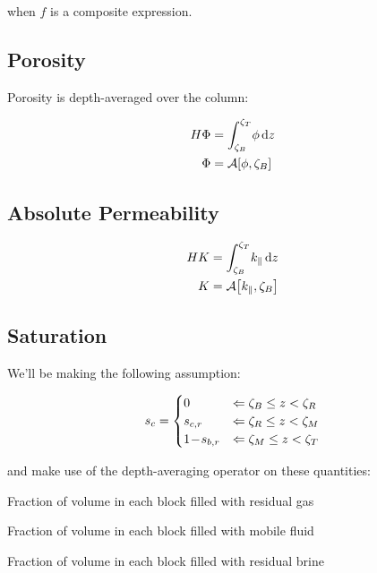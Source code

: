 \documentclass[12pt]{scrartcl}
\newcommand{\wid}[1]{\widthof{\bfseries {#1} \hspace{\labelsep}}}
\newcommand{\aleft}{\mathopen{}\mathclose\bgroup\left}  %
\newcommand{\aright}{\aftergroup\egroup\right}          %
\newcommand{\binop}[3]{#1\mkern1mu{#2}\mkern1mu #3}     %
\newcommand{\dual}[1]{\binop{1}{-}{#1}}                 %
\newcommand{\ddual}[2]{\binop{\binop{1}{-}{#1}}{-}{#2}} %
\newcommand{\intg}[4]{\int_{#1}^{#2}\!{#3}\,\mathrm{d}{#4}}   %
\newcommand{\latr}[1]{{#1}_{\|}}                              %
\newcommand{\Hei}{H}        %
\newcommand{\Por}{\Phi}     %
\newcommand{\por}{\phi}     %
\newcommand{\sat}{s}        %
\newcommand{\sr}[1]{\sat_{#1,r}}    %
\newcommand{\Prm}{K}        %
\newcommand{\prm}{k}        %
\newcommand{\Lev}{\zeta}    %
\newcommand{\Top}{T}        %
\newcommand{\Bot}{B}        %
\newcommand{\Res}{R}        %
\newcommand{\Mob}{M}        %
\newcommand{\dph}{z}        %
\newcommand{\nap}{c}        %
\newcommand{\wet}{b}        %
\newcommand{\avg}[2]{\mathcal{A}\aleft[#1, #2\aright]}  %
\newcommand{\f}{f}          %
\newcommand{\satn}{\sat_\nap}
\newcommand{\snr}{\sr{\nap}}    %
\newcommand{\swr}{\sr{\wet}}    %
\newcommand{\LevT}{\Lev_\Top}
\newcommand{\LevB}{\Lev_\Bot}
\newcommand{\LevM}{\Lev_\Mob}
\newcommand{\LevR}{\Lev_\Res}
\begin{document}
when \( \f \) is a composite expression.

\subsection{Porosity}
Porosity is depth-averaged over the column:

\begin{align}
\Hei \Por &= \intg{ \LevB }{ \LevT }{ \por }{ \dph } \\
\Por &= \avg{ \por }{ \LevB }
\end{align}

\subsection{Absolute Permeability}
\begin{align}
\Hei \Prm &= \intg{ \LevB }{ \LevT }{ \latr{ \prm } }{ \dph } \\
\Prm &= \avg{ \latr{ \prm } }{ \LevB }
\end{align}

\subsection{Saturation}
We'll be making the following assumption:

\begin{equation}
\satn =
\begin{cases}
0        & \Leftarrow \LevB \leq \dph < \LevR \\
\snr     & \Leftarrow \LevR \leq \dph < \LevM \\
\dual{ \swr } & \Leftarrow \LevM \leq \dph < \LevT
\end{cases}
\end{equation}

and make use of the depth-averaging operator on these quantities:

\begin{description}[labelwidth=\wid{\( \por \left( \ddual{ \swr }{ \snr } \right) \)}]
\item[ \( \por \left( \snr \right) \) ] Fraction of volume in each block filled with residual gas
\item[ \( \por \left( \ddual{ \swr }{ \snr } \right) \) ] Fraction of volume in each block filled with mobile fluid
\item[ \( \por \left( \dual{ \swr } \right) \) ] Fraction of volume in each block filled with residual brine
\end{description}
\end{document}
